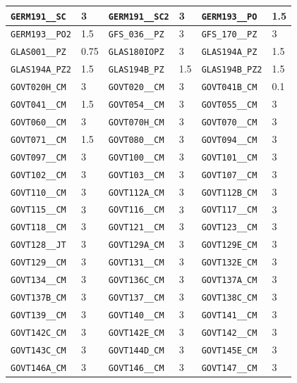 \begin{longtable}{|l|l||l|l||l|l|}
    \verb|GERM191__SC| & 3 & \verb|GERM191__SC2| & 3 & \verb|GERM193__PO| & 1.5\\\hline
    \verb|GERM193__PO2| & 1.5 & \verb|GFS_036__PZ| & 3 & \verb|GFS_170__PZ| & 3\\\hline
    \verb|GLAS001__PZ| & 0.75 & \verb|GLAS180IOPZ| & 3 & \verb|GLAS194A_PZ| & 1.5\\\hline
    \verb|GLAS194A_PZ2| & 1.5 & \verb|GLAS194B_PZ| & 1.5 & \verb|GLAS194B_PZ2| & 1.5\\\hline
    \verb|GOVT020H_CM| & 3 & \verb|GOVT020__CM| & 3 & \verb|GOVT041B_CM| & 0.1\\\hline
    \verb|GOVT041__CM| & 1.5 & \verb|GOVT054__CM| & 3 & \verb|GOVT055__CM| & 3\\\hline
    \verb|GOVT060__CM| & 3 & \verb|GOVT070H_CM| & 3 & \verb|GOVT070__CM| & 3\\\hline
    \verb|GOVT071__CM| & 1.5 & \verb|GOVT080__CM| & 3 & \verb|GOVT094__CM| & 3\\\hline
    \verb|GOVT097__CM| & 3 & \verb|GOVT100__CM| & 3 & \verb|GOVT101__CM| & 3\\\hline
    \verb|GOVT102__CM| & 3 & \verb|GOVT103__CM| & 3 & \verb|GOVT107__CM| & 3\\\hline
    \verb|GOVT110__CM| & 3 & \verb|GOVT112A_CM| & 3 & \verb|GOVT112B_CM| & 3\\\hline
    \verb|GOVT115__CM| & 3 & \verb|GOVT116__CM| & 3 & \verb|GOVT117__CM| & 3\\\hline
    \verb|GOVT118__CM| & 3 & \verb|GOVT121__CM| & 3 & \verb|GOVT123__CM| & 3\\\hline
    \verb|GOVT128__JT| & 3 & \verb|GOVT129A_CM| & 3 & \verb|GOVT129E_CM| & 3\\\hline
    \verb|GOVT129__CM| & 3 & \verb|GOVT131__CM| & 3 & \verb|GOVT132E_CM| & 3\\\hline
    \verb|GOVT134__CM| & 3 & \verb|GOVT136C_CM| & 3 & \verb|GOVT137A_CM| & 3\\\hline
    \verb|GOVT137B_CM| & 3 & \verb|GOVT137__CM| & 3 & \verb|GOVT138C_CM| & 3\\\hline
    \verb|GOVT139__CM| & 3 & \verb|GOVT140__CM| & 3 & \verb|GOVT141__CM| & 3\\\hline
    \verb|GOVT142C_CM| & 3 & \verb|GOVT142E_CM| & 3 & \verb|GOVT142__CM| & 3\\\hline
    \verb|GOVT143C_CM| & 3 & \verb|GOVT144D_CM| & 3 & \verb|GOVT145E_CM| & 3\\\hline
    \verb|GOVT146A_CM| & 3 & \verb|GOVT146__CM| & 3 & \verb|GOVT147__CM| & 3\\\hline

\end{longtable}
